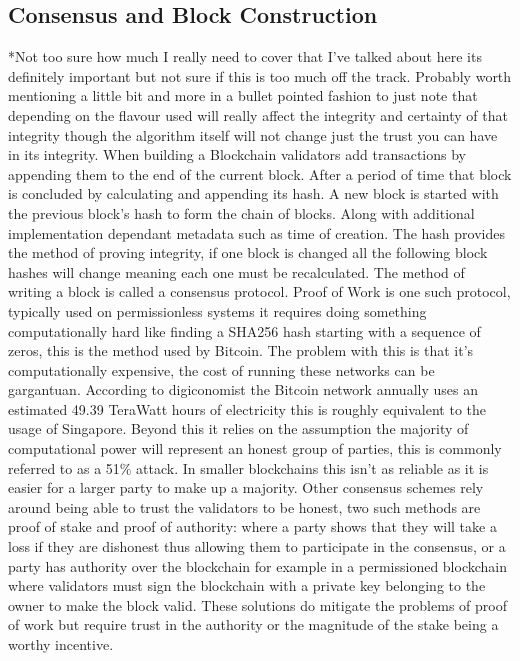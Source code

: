 \documentclass{entcs}
\begin{document}
\subsection{Consensus and Block Construction}
*Not too sure how much I really need to cover that I've talked about here its definitely important but not sure if this is too much off the track. Probably worth mentioning a little bit and more in a bullet pointed fashion to just note that depending on the flavour used will really affect the integrity and certainty of that integrity though the algorithm itself will not change just the trust you can have in its integrity.
When building a Blockchain validators add transactions by appending them to the end of the current block. After a period of time that block is concluded by calculating and appending its hash. A new block is started with the previous block's hash to form the chain of blocks. Along with additional implementation dependant metadata such as time of creation. The hash provides the method of proving integrity, if one block is changed all the following block hashes will change meaning each one must be recalculated. The method of writing a block is called a consensus protocol. Proof of Work\cite{BTCWhitepaper} is one such protocol, typically used on permissionless systems it requires doing something computationally hard like finding a SHA256 hash starting with a sequence of zeros, this is the method used by Bitcoin. The problem with this is that it's computationally expensive, the cost of running these networks can be gargantuan. According to digiconomist \cite{BTCenergy} the Bitcoin network annually uses an estimated 49.39 TeraWatt hours of electricity this is roughly equivalent to the usage of Singapore. Beyond this it relies on the assumption the majority of computational power will represent an honest group of parties, this is commonly referred to as a 51\% attack\cite{BTCWhitepaper}\cite{baliga2017understanding}. In smaller blockchains this isn't as reliable as it is easier for a larger party to make up a majority. 
Other consensus schemes rely around being able to trust the validators to be honest, two such methods are proof of stake and proof of authority\cite{blockchainBeginners}\cite{baliga2017understanding}: where a party shows that they will take a loss if they are dishonest thus allowing them to participate in the consensus, or a party has authority over the blockchain for example in a permissioned blockchain where validators must sign the blockchain with a private key belonging to the owner to make the block valid. These solutions do mitigate the problems of proof of work but require trust in the authority or the magnitude of the stake being a worthy incentive.
\end{document}
